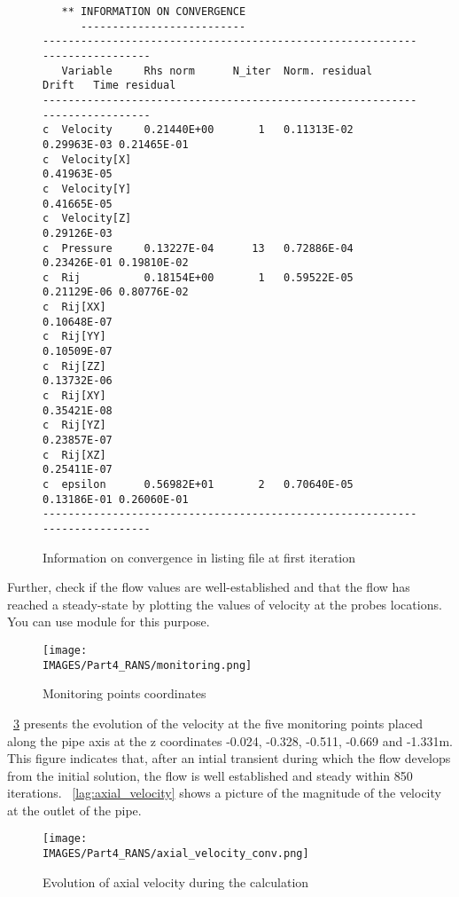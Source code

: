%
\begin{figure}[H]
\scriptsize{
\begin{lstlisting}
   ** INFORMATION ON CONVERGENCE
      --------------------------
----------------------------------------------------------------------------
   Variable     Rhs norm      N_iter  Norm. residual   Drift   Time residual
----------------------------------------------------------------------------
c  Velocity     0.21440E+00       1   0.11313E-02   0.29963E-03 0.21465E-01 
c  Velocity[X]                                      0.41963E-05 
c  Velocity[Y]                                      0.41665E-05 
c  Velocity[Z]                                      0.29126E-03 
c  Pressure     0.13227E-04      13   0.72886E-04   0.23426E-01 0.19810E-02 
c  Rij          0.18154E+00       1   0.59522E-05   0.21129E-06 0.80776E-02 
c  Rij[XX]                                          0.10648E-07 
c  Rij[YY]                                          0.10509E-07 
c  Rij[ZZ]                                          0.13732E-06 
c  Rij[XY]                                          0.35421E-08 
c  Rij[YZ]                                          0.23857E-07 
c  Rij[XZ]                                          0.25411E-07 
c  epsilon      0.56982E+01       2   0.70640E-05   0.13186E-01 0.26060E-01 
----------------------------------------------------------------------------
\end{lstlisting}}
\caption{Information on convergence in listing file at first iteration}\label{lag:cap2_iter}
\end{figure}
%
Further, check if the flow values are well-established and that the flow has reached a steady-state by plotting the values of velocity at the probes locations. You can use \salome module \paravis for this purpose.
%
\begin{figure}[H] 
\centering
\texttt{[image: \\IMAGES/Part4\_RANS/monitoring.png]} 
\caption{Monitoring points coordinates}
\label{lag:cap1_monit}
\end{figure}
%
\figurename~\ref{lag:cap2_monit} presents the evolution of the velocity at the five monitoring points placed along the pipe axis at the z coordinates -0.024, -0.328, -0.511, -0.669 and -1.331m. This figure indicates that, after an intial transient during which the flow develops from the initial solution, the flow is well established and steady within 850 iterations. \figurename~\ref{lag:axial_velocity} shows a picture of the magnitude of the velocity at the outlet of the pipe.  
%
\begin{figure}[H]
\centering
\texttt{[image: \\IMAGES/Part4\_RANS/axial\_velocity\_conv.png]}
\caption{Evolution of axial velocity during the calculation}
\label{lag:cap2_monit}
\end{figure}
